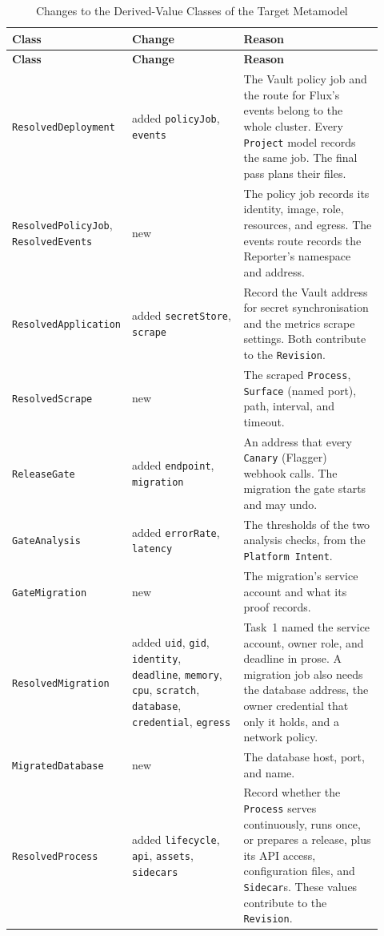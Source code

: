 \begin{longtable}{>{\raggedright\arraybackslash}p{0.22\linewidth}>{\raggedright\arraybackslash}p{0.31\linewidth}>{\raggedright\arraybackslash}p{0.39\linewidth}}
\hline
\textbf{Class} & \textbf{Change} & \textbf{Reason} \\
\hline
\endfirsthead
\hline
\textbf{Class} & \textbf{Change} & \textbf{Reason} \\
\hline
\endhead
\hline
\endfoot
\hline
\caption{Changes to the Derived-Value Classes of the Target Metamodel}
\label{tab:targetvalues}
\endlastfoot
\texttt{ResolvedDeployment} & added \texttt{policyJob}, \texttt{events} & The Vault policy job and the route for Flux's events belong to the whole cluster. Every \texttt{Project} model records the same job. The final pass plans their files. \\
\texttt{ResolvedPolicyJob}, \texttt{ResolvedEvents} & new & The policy job records its identity, image, role, resources, and egress. The events route records the Reporter's namespace and address. \\
\texttt{ResolvedApplication} & added \texttt{secretStore}, \texttt{scrape} & Record the Vault address for secret synchronisation and the metrics scrape settings. Both contribute to the \texttt{Revision}. \\
\texttt{ResolvedScrape} & new & The scraped \texttt{Process}, \texttt{Surface} (named port), path, interval, and timeout. \\
\texttt{ReleaseGate} & added \texttt{endpoint}, \texttt{migration} & An address that every \texttt{Canary} (Flagger) webhook calls. The migration the gate starts and may undo. \\
\texttt{GateAnalysis} & added \texttt{errorRate}, \texttt{latency} & The thresholds of the two analysis checks, from the \texttt{Platform Intent}. \\
\texttt{GateMigration} & new & The migration's service account and what its proof records. \\
\texttt{ResolvedMigration} & added \texttt{uid}, \texttt{gid}, \texttt{identity}, \texttt{deadline}, \texttt{memory}, \texttt{cpu}, \texttt{scratch}, \texttt{database}, \texttt{credential}, \texttt{egress} & Task~1 named the service account, owner role, and deadline in prose. A migration job also needs the database address, the owner credential that only it holds, and a network policy. \\
\texttt{MigratedDatabase} & new & The database host, port, and name. \\
\texttt{ResolvedProcess} & added \texttt{lifecycle}, \texttt{api}, \texttt{assets}, \texttt{sidecars} & Record whether the \texttt{Process} serves continuously, runs once, or prepares a release, plus its API access, configuration files, and \texttt{Sidecar}s. These values contribute to the \texttt{Revision}. \\

\end{longtable}
